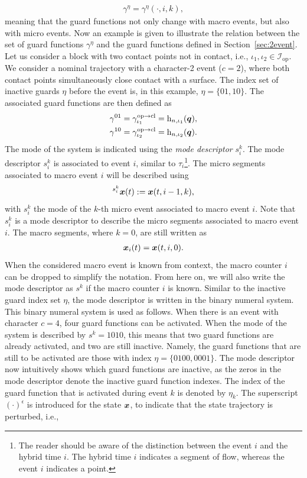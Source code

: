 \documentclass[../DC2019003Bouma.tex]{subfiles}
\begin{document}
\begin{align}
\gamma^\eta = \gamma^\eta(\cdot,i,k),\label{eq:4gammaik}
\end{align}
meaning that the guard functions not only change with macro events, but also with micro events. Now an example is given to illustrate the relation between the set of guard functions $\gamma^\eta$ and the guard functions defined in Section~\ref{sec:2event}. Let us consider a block with two contact points not in contact, i.e., $\iota_1,\iota_2\in\mathcal{I}_{\text{op}}$. We consider a nominal trajectory with a character-2 event ($c=2$), where both contact points simultaneously close contact with a surface. The index set of inactive guards $\eta$ before the event is, in this example, $\eta = \{01,10\}$. The associated guard functions are then defined as
\begin{align}
\gamma^{01} &= \gamma^{\text{op}\rightarrow\text{cl}}_{\iota_1} = \mathrm{h}_{n,\iota_1}({\boldsymbol{q}}),\\
\gamma^{10} &= \gamma^{\text{op}\rightarrow\text{cl}}_{\iota_2} = \mathrm{h}_{n,\iota_2}({\boldsymbol{q}}).
\end{align}
The mode of the system is indicated using the \textit{mode descriptor} $s^k_i$. The mode descriptor $s^k_i$ is associated to event $i$, similar to $\tau_i$\footnote{The reader should be aware of the distinction between the event $i$ and the hybrid time $i$. The hybrid time $i$ indicates a segment of flow, whereas the event $i$ indicates a point.}. The micro segments associated to macro event $i$ will be described using
\begin{align}
\hspace{0cm}^{s^k_i}{\boldsymbol{x}}(t) := {\boldsymbol{x}}(t,i-1,k),
\end{align}
with $s^k_i$ the mode of the $k$-th micro event associated to macro event $i$. Note that $s_i^k$ is a mode descriptor to describe the micro segments associated to macro event $i$. The macro segments, where $k=0$, are still written as 
\begin{align}
{\boldsymbol{x}}_i(t) = {\boldsymbol{x}}(t,i,0).
\end{align}
When the considered macro event is known from context, the macro counter $i$ can be dropped to simplify the notation. From here on, we will also write the mode descriptor as $s^k$ if the macro counter $i$ is known. Similar to the inactive guard index set $\eta$, the mode descriptor is written in the binary numeral system. This binary numeral system is used as follows. When there is an event with character $c = 4$, four guard functions can be activated. When the mode of the system is described by $s^k = 1010$, this means that two guard functions are already activated, and two are still inactive. Namely, the guard functions that are still to be activated are those with index $\eta = \{0100,0001\}$. The mode descriptor now intuitively shows which guard functions are inactive, as the zeros in the mode descriptor denote the inactive guard function indexes. The index of the guard function that is activated during event $k$ is denoted by $\eta_k$. The superscript $(\cdot)^{\epsilon}$ is introduced for the state ${\boldsymbol{x}}$, to indicate that the state trajectory is perturbed, i.e.,
\end{document}
